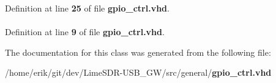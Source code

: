 Definition at line {\bf 25} of file {\bf gpio\+\_\+ctrl.\+vhd}.

\paragraph[{std\+\_\+logic\+\_\+1164}]{\hspace{0.3cm}{\ttfamily [Package]}}\label{classgpio__ctrl_acd03516902501cd1c7296a98e22c6fcb}


Definition at line {\bf 9} of file {\bf gpio\+\_\+ctrl.\+vhd}.



The documentation for this class was generated from the following file\+:\begin{DoxyCompactItemize}
\item 
/home/erik/git/dev/\+Lime\+S\+D\+R-\/\+U\+S\+B\+\_\+\+G\+W/src/general/{\bf gpio\+\_\+ctrl.\+vhd}\end{DoxyCompactItemize}
